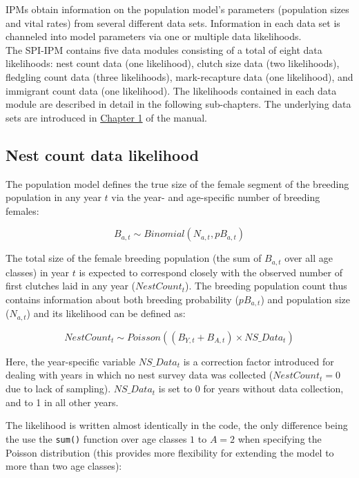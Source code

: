 \documentclass[
]{book}
\begin{document}
IPMs obtain information on the population model's parameters (population sizes
and vital rates) from several different data sets. Information in each data set
is channeled into model parameters via one or multiple data likelihoods.\\
The SPI-IPM contains five data modules consisting of a total of eight data
likelihoods: nest count data (one likelihood), clutch size data (two likelihoods),
fledgling count data (three likelihoods), mark-recapture data (one likelihood),
and immigrant count data (one likelihood).
The likelihoods contained in each data module are described in detail in the
following sub-chapters. The underlying data sets are introduced in
\protect\hyperlink{DataPrep}{Chapter 1} of the manual.

\hypertarget{nest-count-data-likelihood}{%
\subsection{Nest count data likelihood}\label{nest-count-data-likelihood}}

The population model defines the true size of the female segment of the breeding
population in any year \(t\) via the year- and age-specific number of breeding
females:

\begin{equation}
B_{a,t}  \sim Binomial(N_{a,t}, pB_{a,t})
\end{equation}

The total size of the female breeding population (the sum of \(B_{a,t}\) over all
age classes) in year \(t\) is expected to correspond closely with the observed
number of first clutches laid in any year (\(NestCount_t\)).
The breeding population count thus contains information about both breeding
probability (\(pB_{a,t}\)) and population size (\(N_{a,t}\)) and its likelihood can
be defined as:

\begin{equation}
NestCount_t  \sim Poisson((B_{Y,t} + B_{A,t}) \times NS\_Data_t)
\end{equation}

Here, the year-specific variable \(NS\_Data_t\) is a correction factor introduced
for dealing with years in which no nest survey data was collected
(\(NestCount_t = 0\) due to lack of sampling). \(NS\_Data_t\) is set to 0 for years
without data collection, and to 1 in all other years.

The likelihood is written almost identically in the code, the only difference
being the use the \texttt{sum()} function over age classes \(1\) to \(A=2\) when
specifying the Poisson distribution (this provides more flexibility for
extending the model to more than two age classes):
\end{document}
